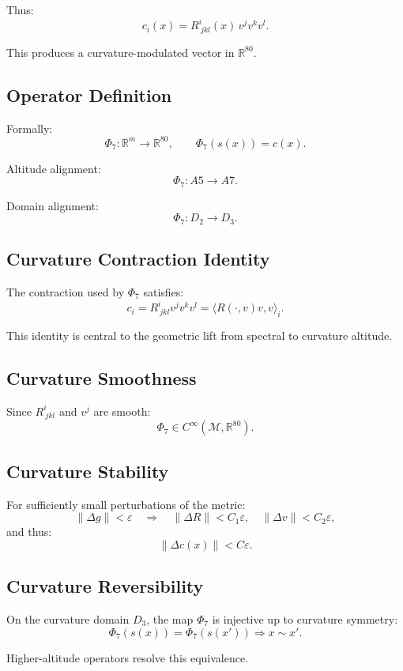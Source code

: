 Thus:
\[
c_i(x) = R^i_{\ jkl}(x) \, v^j v^k v^l.
\]

This produces a curvature-modulated vector in $\mathbb{R}^{80}$.

\subsection{Operator Definition}

Formally:
\[
\Phi_7 : \mathbb{R}^m \to \mathbb{R}^{80},
\qquad
\Phi_7(s(x)) = c(x).
\]

Altitude alignment:
\[
\Phi_7 : A5 \to A7.
\]

Domain alignment:
\[
\Phi_7 : D_2 \to D_3.
\]

\subsection{Curvature Contraction Identity}

The contraction used by $\Phi_7$ satisfies:
\[
c_i = R^i_{\ jkl} v^j v^k v^l
= \langle R(\cdot, v)v, v \rangle_i.
\]

This identity is central to the geometric lift from spectral to curvature
altitude.

\subsection{Curvature Smoothness}

Since $R^i_{\ jkl}$ and $v^j$ are smooth:
\[
\Phi_7 \in C^\infty(\mathcal{M}, \mathbb{R}^{80}).
\]

\subsection{Curvature Stability}

For sufficiently small perturbations of the metric:
\[
\| \Delta g \| < \varepsilon
\quad\Longrightarrow\quad
\| \Delta R \| < C_1 \varepsilon,
\quad
\| \Delta v \| < C_2 \varepsilon,
\]
and thus:
\[
\| \Delta c(x) \| < C \varepsilon.
\]

\subsection{Curvature Reversibility}

On the curvature domain $D_3$, the map $\Phi_7$ is injective up to curvature
symmetry:
\[
\Phi_7(s(x)) = \Phi_7(s(x')) \Rightarrow x \sim x'.
\]

Higher-altitude operators resolve this equivalence.

